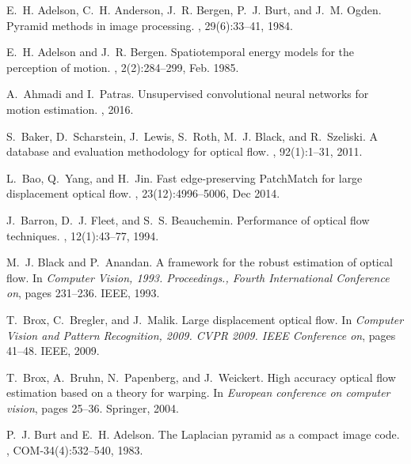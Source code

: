 \documentclass[10pt,twocolumn,letterpaper]{article}
\begin{document}
\begin{thebibliography}{10}\itemsep=-1pt

E.~H. Adelson, C.~H. Anderson, J.~R. Bergen, P.~J. Burt, and J.~M. Ogden.
\newblock Pyramid methods in image processing.
, 29(6):33--41, 1984.

E.~H. Adelson and J.~R. Bergen.
\newblock Spatiotemporal energy models for the perception of motion.
, 2(2):284--299, Feb. 1985.

A.~Ahmadi and I.~Patras.
\newblock Unsupervised convolutional neural networks for motion estimation.
, 2016.

S.~Baker, D.~Scharstein, J.~Lewis, S.~Roth, M.~J. Black, and R.~Szeliski.
\newblock A database and evaluation methodology for optical flow.
, 92(1):1--31, 2011.

L.~Bao, Q.~Yang, and H.~Jin.
\newblock Fast edge-preserving {PatchMatch} for large displacement optical
  flow.
, 23(12):4996--5006, Dec
  2014.

J.~Barron, D.~J. Fleet, and S.~S. Beauchemin.
\newblock Performance of optical flow techniques.
, 12(1):43--77, 1994.

M.~J. Black and P.~Anandan.
\newblock A framework for the robust estimation of optical flow.
\newblock In {\em Computer Vision, 1993. Proceedings., Fourth International
  Conference on}, pages 231--236. IEEE, 1993.

T.~Brox, C.~Bregler, and J.~Malik.
\newblock Large displacement optical flow.
\newblock In {\em Computer Vision and Pattern Recognition, 2009. CVPR 2009.
  IEEE Conference on}, pages 41--48. IEEE, 2009.

T.~Brox, A.~Bruhn, N.~Papenberg, and J.~Weickert.
\newblock High accuracy optical flow estimation based on a theory for warping.
\newblock In {\em European conference on computer vision}, pages 25--36.
  Springer, 2004.

P.~J. Burt and E.~H. Adelson.
\newblock The {Laplacian} pyramid as a compact image code.
, COM-34(4):532--540, 1983.


\end{thebibliography}
\end{document}
